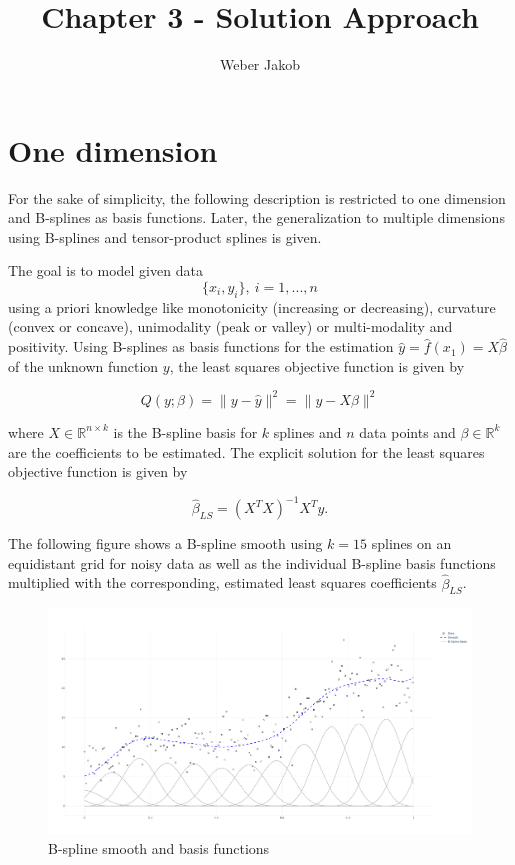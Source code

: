 \documentclass[10pt,a4paper]{article}
\title{Chapter 3 - Solution Approach}
\author{Weber Jakob}
\begin{document}
	\maketitle
	
	\section{One dimension} \label{1D}
 	For the sake of simplicity, the following description is restricted to one dimension and B-splines as basis functions. Later, the generalization to multiple dimensions using B-splines and tensor-product splines is given. 
 
 	The goal is to model given data $$\{x_i, y_i\}, \ i = 1, ..., n$$ using a priori knowledge like monotonicity (increasing or decreasing), curvature (convex or concave), unimodality (peak or valley) or multi-modality and positivity. Using B-splines as basis functions for the estimation $\hat y =  \hat f(x_1) = X\hat \beta$ of the unknown function $y$, the least squares objective function is given by
	
	$$Q(y;\beta) = \lVert y - \hat y\rVert^2 = \lVert y - X\beta\rVert^2 $$
	
	where $X \in \mathbb{R}^{n \times k}$ is the B-spline basis for $k$ splines and $n$ data points and $\beta \in \mathbb{R}^k$ are the coefficients to be estimated. The explicit solution for the least squares objective function is given by
	
	$$\hat \beta_{LS}= (X^TX)^{-1}X^T y.$$
	
	The following figure shows a B-spline smooth using $k=15$ splines on an equidistant grid for noisy data as well as the individual B-spline basis functions multiplied with the corresponding, estimated least squares coefficients $\hat \beta_{LS}$.
	
	\begin{figure}[H]
		\centering
		\includegraphics[width=\linewidth]{thesisplots/smooth_plus_basis.pdf}
		\caption{B-spline smooth and basis functions}
		\label{fig:smooth_bf}
    \end{figure}
	
\end{document}
